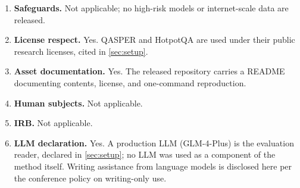 \documentclass{article}
\begin{document}
\begin{enumerate}
\item \textbf{Safeguards.} Not applicable; no high-risk models or
internet-scale data are released.
\item \textbf{License respect.} Yes. QASPER and HotpotQA are used under
their public research licenses, cited in \autoref{sec:setup}.
\item \textbf{Asset documentation.} Yes. The released repository carries
a README documenting contents, license, and one-command reproduction.
\item \textbf{Human subjects.} Not applicable.
\item \textbf{IRB.} Not applicable.
\item \textbf{LLM declaration.} Yes. A production LLM (GLM-4-Plus) is
the evaluation reader, declared in \autoref{sec:setup}; no LLM was used
as a component of the method itself. Writing assistance from language
models is disclosed here per the conference policy on writing-only use.
\end{enumerate}
\end{document}
